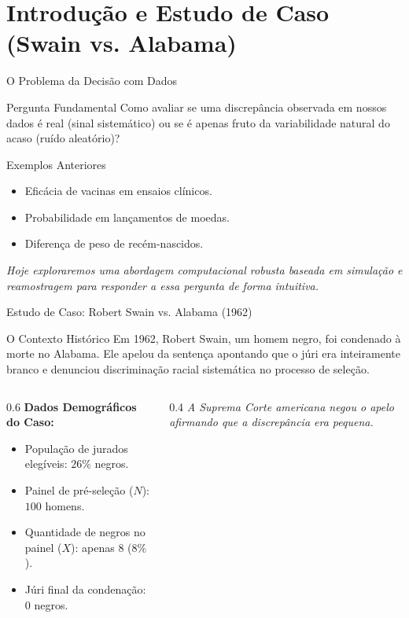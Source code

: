 \section{Introdução e Estudo de Caso (Swain vs. Alabama)}

\begin{frame}{O Problema da Decisão com Dados}
    \begin{block}{Pergunta Fundamental}
        Como avaliar se uma discrepância observada em nossos dados é real (sinal sistemático) ou se é apenas fruto da variabilidade natural do acaso (ruído aleatório)?
    \end{block}
    \begin{block}{Exemplos Anteriores}
        \begin{itemize}
            \item Eficácia de vacinas em ensaios clínicos.
            \item Probabilidade em lançamentos de moedas.
            \item Diferença de peso de recém-nascidos.
        \end{itemize}
    \end{block}
    \centering
    \textit{Hoje exploraremos uma abordagem computacional robusta baseada em simulação e reamostragem para responder a essa pergunta de forma intuitiva.}
\end{frame}

\begin{frame}{Estudo de Caso: Robert Swain vs. Alabama (1962)}
    \begin{block}{O Contexto Histórico}
        Em 1962, Robert Swain, um homem negro, foi condenado à morte no Alabama. Ele apelou da sentença apontando que o júri era inteiramente branco e denunciou discriminação racial sistemática no processo de seleção.
    \end{block}
    \begin{columns}
        \begin{column}{0.6\textwidth}
            \textbf{Dados Demográficos do Caso:}
            \begin{itemize}
                \item População de jurados elegíveis: $26\%$ negros.
                \item Painel de pré-seleção ($N$): $100$ homens.
                \item Quantidade de negros no painel ($X$): apenas $8$ ($8\%$).
                \item Júri final da condenação: $0$ negros.
            \end{itemize}
        \end{column}
        \begin{column}{0.4\textwidth}
            \centering
            \textit{A Suprema Corte americana negou o apelo afirmando que a discrepância era pequena.}
        \end{column}
    \end{columns}
\end{frame}

